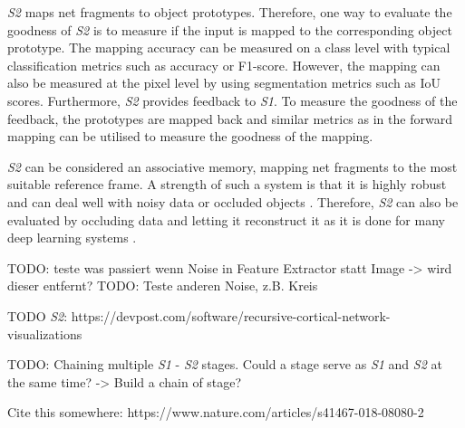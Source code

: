 \emph{S2} maps net fragments to object prototypes. Therefore, one way to evaluate the goodness of \emph{S2} is to measure if the input is mapped to the corresponding object prototype.
The mapping accuracy can be measured on a class level with typical classification metrics such as accuracy or F1-score.
However, the mapping can also be measured at the pixel level by using segmentation metrics such as IoU scores.
Furthermore, \emph{S2} provides feedback to \emph{S1}.
To measure the goodness of the feedback, the prototypes are mapped back and similar metrics as in the forward mapping can be utilised to measure the goodness of the mapping.

\emph{S2} can be considered an associative memory, mapping net fragments to the most suitable reference frame.
A strength of such a system is that it is highly robust and can deal well with noisy data or occluded objects .
Therefore, \emph{S2} can also be evaluated by occluding data and letting it reconstruct it as it is done for many deep learning systems . 







TODO: teste was passiert wenn Noise in Feature Extractor statt Image -> wird dieser entfernt?
TODO: Teste anderen Noise, z.B. Kreis


TODO \emph{S2}: https://devpost.com/software/recursive-cortical-network-visualizations

TODO: Chaining multiple \emph{S1} - \emph{S2} stages. Could a stage serve as \emph{S1} and \emph{S2} at the same time? -> Build a chain of stage?


Cite this somewhere: https://www.nature.com/articles/s41467-018-08080-2
